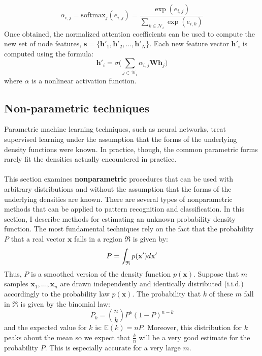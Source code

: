 	\begin{equation}
		\alpha_{i,j} = \text{softmax}_j(e_{i,j}) = \frac{\exp(e_{i,j})}{\sum_{k\in \mathcal{N}_i} \exp(e_{i,k})}
	\end{equation}
	Once obtained, the normalized attention coefficients can be used to compute the new set of node features, $\mathbf{s} = \{ \mathbf{h'}_1, \mathbf{h'}_2, \dots , \mathbf{h'}_N  \}$. Each new feature vector $\mathbf{h'}_i$ is computed using the formula:
	\begin{equation}
		\mathbf{h'}_i = \sigma \Bigg( \sum_{j \in \mathcal{N}_i} \alpha_{i,j} \mathbf{W} \mathbf{h}_j \Bigg) 
	\end{equation}
	where $\alpha$ is a nonlinear activation function. 
	\subsection{Non-parametric techniques}	\label{Section 2.2.5}
	Parametric machine learning techniques, such as neural networks, treat supervised learning under the assumption that the forms of the underlying density functions were known. In practice, though, the common parametric forms rarely fit the densities actually encountered in practice. 
	\\ \\
	This section examines \textbf{nonparametric} procedures that can be used with arbitrary distributions and without the assumption that the forms of the underlying densities are known. There are several types of nonparametric methods that can be applied to pattern recognition and classification. In this section, I describe methods for estimating an unknown probability density function. The most fundamental techniques rely on the fact that the probability $P$ that a real vector $\mathbf{x}$ falls in a region $\mathfrak{R}$ is given by:
	\begin{equation}
		\centering
		P = \int_{\mathfrak{R}} p(\mathbf{x'}) d\mathbf{x'}
	\end{equation}
	Thus, $P$ is a smoothed version of the density function $p(\mathbf{x})$. Suppose that $m$ samples $\mathbf{x}_1,\dots ,\mathbf{x}_n$ are drawn independently and identically distributed (i.i.d.) accordingly to the probability law $p(\mathbf{x})$. The probability that $k$ of these $m$ fall in $\mathfrak{R}$ is given by the binomial law:
	\begin{equation}
		P_k = {n\choose k} P^k (1-P)^{n-k}
	\end{equation}
	and the expected value for $k$ is: $\mathbb{E}(k) = nP$. Moreover, this distribution for $k$ peaks about the mean so we expect that $\frac{k}{n}$ will be a very good estimate for the probability $P$. This is especially accurate for a very large $m$. 
